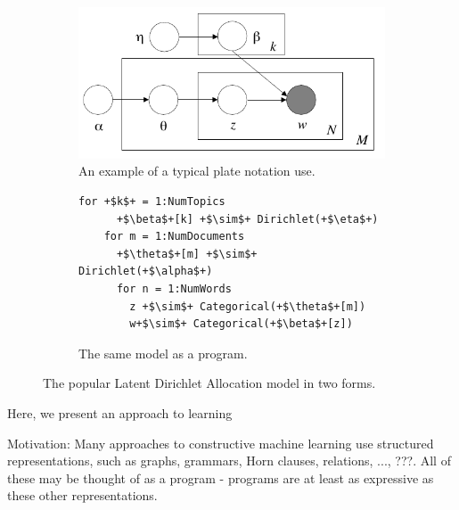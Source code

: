 \documentclass{article} %
\begin{document}


\begin{figure}[h]
\centering
\begin{subfigure}{.5\textwidth}
  \centering
\includegraphics[width=.7\linewidth]{./figures/lda_plate_blei.pdf}
  \caption{An example of a typical plate notation use. \label{fig:lda_plate}}

\end{subfigure}%
\begin{subfigure}{.4\textwidth}
	\begin{lstlisting}[frame=single, numbers=none, xleftmargin=0pt]
	for +$k$+ = 1:NumTopics
	  +$\beta$+[k] +$\sim$+ Dirichlet(+$\eta$+)
	for m = 1:NumDocuments
	  +$\theta$+[m] +$\sim$+ Dirichlet(+$\alpha$+) 
	  for n = 1:NumWords 
	    z +$\sim$+ Categorical(+$\theta$+[m])
	    w+$\sim$+ Categorical(+$\beta$+[z])
	\end{lstlisting}
  \caption{The same model as a program.}
  \label{fig:lda_code}
\end{subfigure}
\caption{The popular Latent Dirichlet Allocation model in two forms.}
\label{fig:lda}
\end{figure}


Here, we present an approach to learning 

Motivation: Many approaches to constructive machine learning use structured representations, such as graphs, grammars, Horn clauses, relations, ..., ???. All of these may be thought of as a program - programs are at least as expressive as these other representations.
\end{document}
